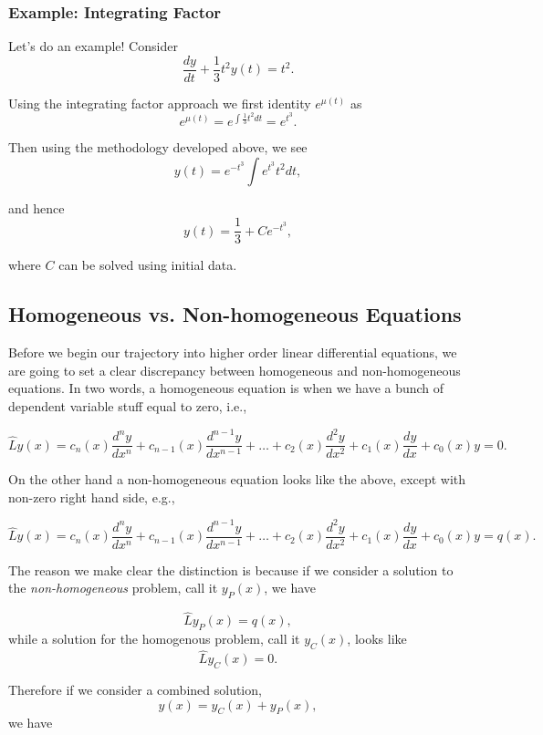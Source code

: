 \subsubsection{Example: Integrating Factor}

Let's do an example! Consider $$\frac{dy}{dt} +  \frac{1}{3} t^2 y(t) = t^2.$$

Using the integrating factor approach we first identity $e^{\mu(t)}$ as $$e^{\mu(t)} = e^{\int \frac{1}{3} t^2 dt } = e^{t^3}.$$

Then using the methodology developed above, we see $$y(t) = e^{-t^3} \int  e^{t^3} t^2 dt,$$

and hence $$y(t) = \frac{1}{3} + C e^{-t^3},$$ 

where $C$ can be solved using initial data.



%
%

\subsection{Homogeneous vs. Non-homogeneous Equations}

Before we begin our trajectory into higher order linear differential equations, we are going to set a clear discrepancy between homogeneous and non-homogeneous equations. In two words, a homogeneous equation is when we have a bunch of dependent variable stuff equal to zero, i.e., 

$$\hat{L}y(x) =  c_n(x) \frac{d^n y}{dx^n} + c_{n-1}(x) \frac{d^{n-1} y}{dx^{n-1}} + \ldots + c_2(x) \frac{d^2 y}{dx^2} + c_1(x) \frac{dy}{dx} + c_0(x) y = 0.$$

On the other hand a non-homogeneous equation looks like the above, except with non-zero right hand side, e.g., 

$$\hat{L}y(x) = c_n(x) \frac{d^n y}{dx^n} + c_{n-1}(x) \frac{d^{n-1} y}{dx^{n-1}} + \ldots + c_2(x) \frac{d^2 y}{dx^2} + c_1(x) \frac{dy}{dx} + c_0(x) y = q(x).$$

The reason we make clear the distinction is because if we consider a solution to the \emph{non-homogeneous} problem, call it $y_P(x)$, we have 

$$\hat{L} y_P(x) = q(x),$$ while a solution for the homogenous problem, call it $y_C(x)$, looks like $$\hat{L} y_C(x) = 0.$$

Therefore if we consider a combined solution, $$y(x) = y_C(x) + y_P(x),$$ we have

